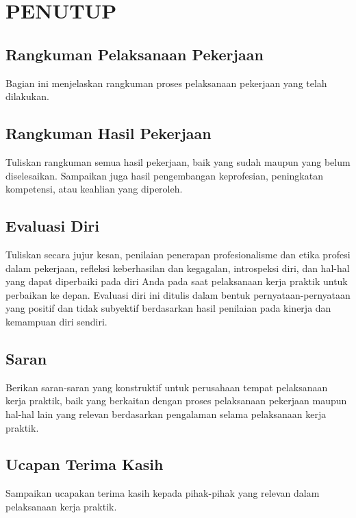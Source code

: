 \cleardoublepage
\chapter{PENUTUP}
\label{chap:penutup}
\section{Rangkuman Pelaksanaan Pekerjaan}
Bagian ini menjelaskan rangkuman proses pelaksanaan pekerjaan yang telah dilakukan.
\section{Rangkuman Hasil Pekerjaan}
Tuliskan rangkuman semua hasil pekerjaan, baik yang sudah maupun yang belum diselesaikan. Sampaikan juga hasil pengembangan keprofesian, peningkatan kompetensi, atau keahlian yang diperoleh.
\section{Evaluasi Diri}
Tuliskan secara jujur kesan, penilaian penerapan profesionalisme dan etika profesi dalam pekerjaan, refleksi keberhasilan dan kegagalan, introspeksi diri, dan hal-hal yang dapat diperbaiki pada diri Anda pada saat pelaksanaan kerja praktik untuk perbaikan ke depan. Evaluasi diri ini ditulis dalam bentuk pernyataan-pernyataan yang positif dan tidak subyektif berdasarkan hasil penilaian pada kinerja dan kemampuan diri sendiri.
\section{Saran}
Berikan saran-saran yang konstruktif untuk perusahaan tempat pelaksanaan kerja praktik, baik yang berkaitan dengan proses pelaksanaan pekerjaan maupun hal-hal lain yang relevan berdasarkan pengalaman selama pelaksanaan kerja praktik.
\section{Ucapan Terima Kasih}
Sampaikan ucapakan terima kasih kepada pihak-pihak yang relevan dalam pelaksanaan kerja praktik.

